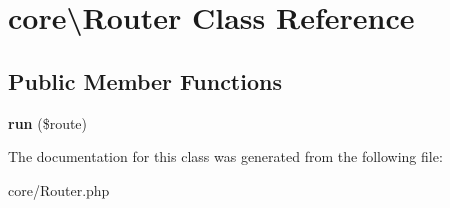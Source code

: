 \hypertarget{classcore_1_1Router}{}\section{core\textbackslash{}Router Class Reference}
\label{classcore_1_1Router}
\subsection*{Public Member Functions}
\begin{DoxyCompactItemize}
\item 
{\bfseries run} (\$route)\hypertarget{classcore_1_1Router_a851f70282c4ad784a3ea04c643860969}{}\label{classcore_1_1Router_a851f70282c4ad784a3ea04c643860969}

\end{DoxyCompactItemize}


The documentation for this class was generated from the following file\+:\begin{DoxyCompactItemize}
\item 
core/Router.\+php\end{DoxyCompactItemize}
